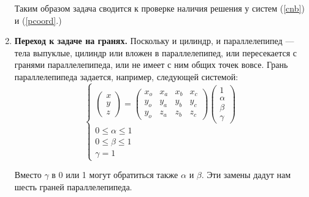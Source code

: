 \documentclass[pdftex,ptm,12pt,a4paper]{report}
\begin{document}
\begin{enumerate}
      Таким образом задача сводится к проверке наличия решения у систем (\ref{cnb}) и (\ref{pcoord}.)
  \item
    \textbf{Переход к задаче на гранях.}
    Поскольку и цилиндр, и параллелепипед --- тела выпуклые, цилиндр или вложен в параллелепипед, или пересекается с гранями параллелепипеда, или не имеет с ним общих точек вовсе.
    Грань параллелепипеда задается, например, следующей системой:
    \begin{equation}\label{planecoord}
      \begin{cases}
        \begin{pmatrix} x \\ y \\ z \end{pmatrix}            
        =
        \begin{pmatrix} x_o & x_a & x_b & x_c \\ y_o & y_a & y_b & y_c  \\ y_o & z_a & z_b & z_c 
        \end{pmatrix} \begin {pmatrix} 1 \\ \alpha \\ \beta \\ \gamma \end{pmatrix} \\
        0 \le  \alpha   \le  1 \\
        0 \le  \beta   \le  1 \\
        \gamma   =  1 
      \end{cases}
    \end{equation}

    Вместо $\gamma$ в 0 или 1 могут обратиться также $\alpha$ и $\beta$.
    Эти замены дадут нам шесть граней параллелепипеда.


\end{enumerate}
\end{document}
